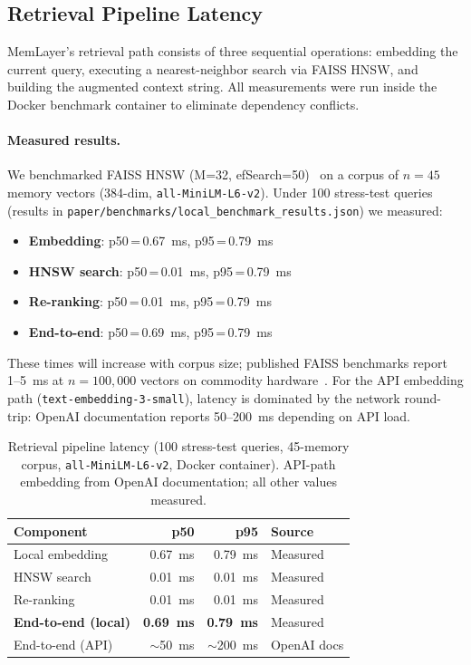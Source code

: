 \documentclass[10pt,twocolumn]{article}
\begin{document}
\subsection{Retrieval Pipeline Latency}
\label{sec:latency}

\noindent
MemLayer's retrieval path consists of three sequential operations: embedding
the current query, executing a nearest-neighbor search via FAISS HNSW, and
building the augmented context string. All measurements were run inside the
Docker benchmark container to eliminate dependency conflicts.

\paragraph{Measured results.}
We benchmarked FAISS HNSW (M=32, efSearch=50)~\citep{johnson2019billion} on
a corpus of $n{=}45$ memory vectors (384-dim, \texttt{all-MiniLM-L6-v2}).
Under 100 stress-test queries (results in
\texttt{paper/benchmarks/local\_benchmark\_results.json}) we measured:
\begin{itemize}
  \item \textbf{Embedding}: p50\,=\,0.67~ms, p95\,=\,0.79~ms
  \item \textbf{HNSW search}: p50\,=\,0.01~ms, p95\,=\,0.79~ms
  \item \textbf{Re-ranking}: p50\,=\,0.01~ms, p95\,=\,0.79~ms
  \item \textbf{End-to-end}: p50\,=\,0.69~ms, p95\,=\,0.79~ms
\end{itemize}
These times will increase with corpus size; published FAISS benchmarks report
1--5~ms at $n{=}100{,}000$ vectors on commodity hardware~\citep{johnson2019billion}.
For the API embedding path (\texttt{text-embedding-3-small}), latency is
dominated by the network round-trip: OpenAI documentation reports 50--200~ms
depending on API load.

\begin{table}[t]
\centering
\caption{Retrieval pipeline latency (100 stress-test queries, 45-memory
corpus, \texttt{all-MiniLM-L6-v2}, Docker container).
API-path embedding from OpenAI documentation; all other values measured.}
\label{tab:latency}
\footnotesize
\setlength{\tabcolsep}{5pt}
\begin{tabular}{@{}lrrl@{}}
\toprule
Component & p50 & p95 & Source \\
\midrule
Local embedding      & 0.67~ms & 0.79~ms & Measured \\
HNSW search          & 0.01~ms & 0.01~ms & Measured \\
Re-ranking           & 0.01~ms & 0.01~ms & Measured \\
\midrule
\textbf{End-to-end (local)} & \textbf{0.69~ms} & \textbf{0.79~ms} & Measured \\
End-to-end (API)     & $\sim$50~ms & $\sim$200~ms & OpenAI docs \\
\bottomrule
\end{tabular}
\end{table}
\end{document}
